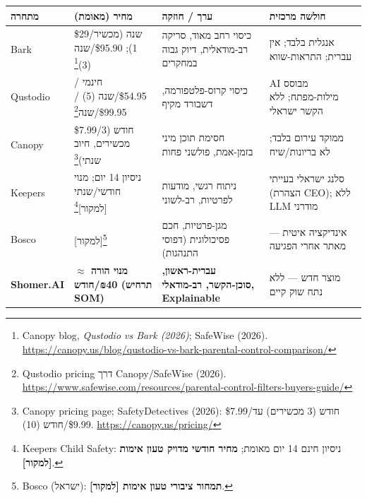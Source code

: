\documentclass[11pt]{article}
\newcommand{\en}[1]{\textenglish{#1}}
\begin{document}
\begin{longtable}{|>{\raggedright\arraybackslash}p{2.2cm}|>{\raggedright\arraybackslash}p{3.2cm}|>{\raggedright\arraybackslash}p{4.8cm}|>{\raggedright\arraybackslash}p{4.5cm}|}
\hline
\rowcolor{hdr}
\textbf{מתחרה} & \textbf{מחיר (מאומת)} & \textbf{ערך / חוזקה} & \textbf{חולשה מרכזית} \\
\hline
\endhead

\en{Bark} &
\en{\$29}/שנה (מכשיר 1); \en{\$95.90}/שנה (3)\footnote{\en{Canopy} blog, \textit{Qustodio vs Bark (2026)}; \en{SafeWise} (2026). \url{https://canopy.us/blog/qustodio-vs-bark-parental-control-comparison/}} &
כיסוי רחב מאוד, סריקה רב-מודאלית, דיוק גבוה במחקרים &
אנגלית בלבד; אין עברית; התראות-שווא \\
\hline

\rowcolor{ltgray}
\en{Qustodio} &
חינמי / \en{\$54.95}/שנה (5) / \en{\$99.95}/שנה\footnote{\en{Qustodio} pricing דרך \en{Canopy/SafeWise} (2026). \url{https://www.safewise.com/resources/parental-control-filters-buyers-guide/}} &
כיסוי קרוס-פלטפורמה, דשבורד מקיף &
\en{AI} מבוסס מילות-מפתח; ללא הקשר ישראלי \\
\hline

\en{Canopy} &
\en{\$7.99}/חודש (3 מכשירים, חיוב שנתי)\footnote{\en{Canopy} pricing page; \en{SafetyDetectives} (2026): \en{\$7.99}/חודש (3 מכשירים) עד \en{\$9.99}/חודש (10). \url{https://canopy.us/pricing/}} &
חסימת תוכן מיני בזמן-אמת, פולשני פחות &
ממוקד עירום בלבד; לא בריונות/שיח \\
\hline

\rowcolor{ltgray}
\en{Keepers} &
ניסיון 14 יום; מנוי חודשי/שנתי \en{[}למקור\en{]}\footnote{\en{Keepers Child Safety}: ניסיון חינם 14 יום מאומת; \textbf{מחיר חודשי מדויק טעון אימות \en{[}למקור\en{]}}.} &
ניתוח רגשי, מודעות לפרטיות, רב-לשוני &
סלנג ישראלי בעייתי (הצהרת \en{CEO}); ללא \en{LLM} מודרני \\
\hline

\en{Bosco} &
\en{[}למקור\en{]}\footnote{\en{Bosco} (ישראל): \textbf{תמחור ציבורי טעון אימות \en{[}למקור\en{]}}.} &
מגן-פרטיות, חכם פסיכולוגית (דפוסי התנהגות) &
אינדיקציה איטית — מאתר אחרי הפגיעה \\
\hline

\rowcolor{hdr}
\textbf{\en{Shomer.AI}} &
\textbf{מנוי הורה $\approx$ ₪\en{40}/חודש (תרחיש \en{SOM})} &
\textbf{עברית-ראשון, סוכן-הקשר, רב-מודאלי, \en{Explainable}} &
מוצר חדש — ללא נתח שוק קיים \\
\hline
\end{longtable}
\end{document}
